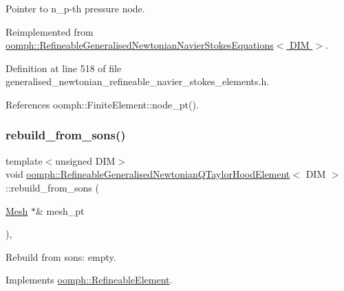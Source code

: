 Pointer to n\+\_\+p-\/th pressure node. 



Reimplemented from \hyperlink{classoomph_1_1RefineableGeneralisedNewtonianNavierStokesEquations_a7192c00c8efe7f1bc48d28122f120899}{oomph\+::\+Refineable\+Generalised\+Newtonian\+Navier\+Stokes\+Equations$<$ D\+I\+M $>$}.



Definition at line 518 of file generalised\+\_\+newtonian\+\_\+refineable\+\_\+navier\+\_\+stokes\+\_\+elements.\+h.



References oomph\+::\+Finite\+Element\+::node\+\_\+pt().

\mbox{\label{classoomph_1_1RefineableGeneralisedNewtonianQTaylorHoodElement_a356391ebd65c493cc40bf1df0749047a}} 
\subsubsection{\texorpdfstring{rebuild\+\_\+from\+\_\+sons()}{rebuild\_from\_sons()}}
{\footnotesize\ttfamily template$<$unsigned D\+IM$>$ \\
void \hyperlink{classoomph_1_1RefineableGeneralisedNewtonianQTaylorHoodElement}{oomph\+::\+Refineable\+Generalised\+Newtonian\+Q\+Taylor\+Hood\+Element}$<$ D\+IM $>$\+::rebuild\+\_\+from\+\_\+sons (\begin{DoxyParamCaption}\item[{\hyperlink{classoomph_1_1Mesh}{Mesh} $\ast$\&}]{mesh\+\_\+pt }\end{DoxyParamCaption})\hspace{0.3cm}{\ttfamily [inline]}, {\ttfamily [virtual]}}



Rebuild from sons\+: empty. 



Implements \hyperlink{classoomph_1_1RefineableElement_a33324be27833fa4b78279d17158215fa}{oomph\+::\+Refineable\+Element}.



